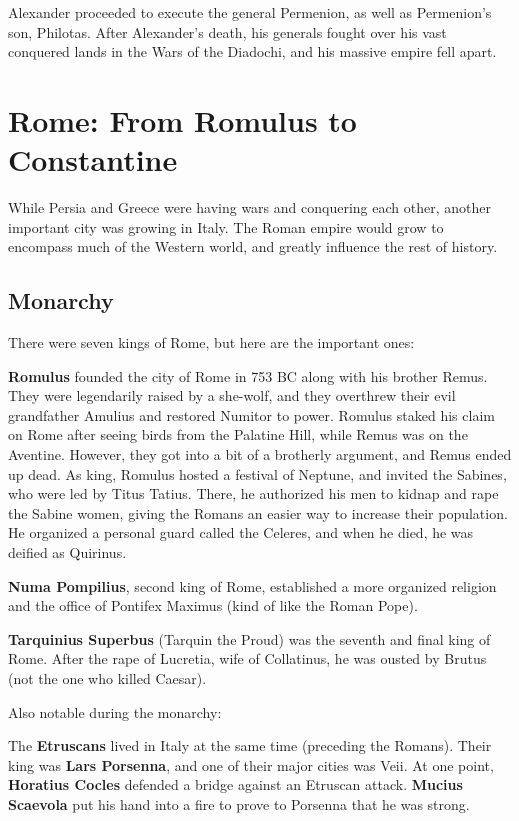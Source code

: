 Alexander proceeded to execute the general Permenion, as well as Permenion's son, Philotas.
After Alexander's death,
his generals fought over his vast conquered lands in the Wars of the Diadochi,
and his massive empire fell apart.

\section{Rome: From Romulus to Constantine}

While Persia and Greece were having wars and conquering each other,
another important city was growing in Italy.
The Roman empire would grow to encompass much of the Western world,
and greatly influence the rest of history.

\subsection*{Monarchy}

There were seven kings of Rome, but here are the important ones:

\textbf{Romulus} founded the city of Rome in 753 BC along with his brother Remus.
They were legendarily raised by a she-wolf,
and they overthrew their evil grandfather Amulius and restored Numitor to power.
Romulus staked his claim on Rome after seeing birds from the Palatine Hill,
while Remus was on the Aventine.
However, they got into a bit of a brotherly argument, and Remus ended up dead.
As king, Romulus hosted a festival of Neptune, and invited the Sabines,
who were led by Titus Tatius.
There, he authorized his men to kidnap and rape the Sabine women,
giving the Romans an easier way to increase their population.
He organized a personal guard called the Celeres, and when he died, he was deified as Quirinus.

\textbf{Numa Pompilius}, second king of Rome,
established a more organized religion and the office of Pontifex Maximus
(kind of like the Roman Pope).

\textbf{Tarquinius Superbus} (Tarquin the Proud) was the seventh and final king of Rome.
After the rape of Lucretia, wife of Collatinus,
he was ousted by Brutus (not the one who killed Caesar).

Also notable during the monarchy:

The \textbf{Etruscans} lived in Italy at the same time (preceding the Romans).
Their king was \textbf{Lars Porsenna}, and one of their major cities was Veii.
At one point, \textbf{Horatius Cocles} defended a bridge against an Etruscan attack.
\textbf{Mucius Scaevola} put his hand into a fire to prove to Porsenna that he was strong.

